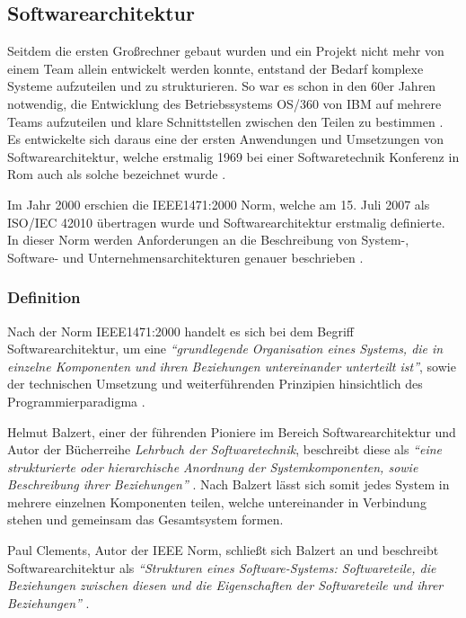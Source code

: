 \subsection{Softwarearchitektur}

Seitdem die ersten Großrechner gebaut wurden und ein Projekt nicht mehr von einem Team allein entwickelt werden konnte, entstand der Bedarf komplexe Systeme aufzuteilen und zu strukturieren. So war es schon in den 60er Jahren notwendig, die Entwicklung des Betriebssystems OS/360 von IBM auf mehrere Teams aufzuteilen und klare Schnittstellen zwischen den Teilen zu bestimmen \parencite{brooks_mythical_1995}. Es entwickelte sich daraus eine der ersten Anwendungen und Umsetzungen von Softwarearchitektur, welche erstmalig 1969 bei einer Softwaretechnik Konferenz in Rom auch als solche bezeichnet wurde \parencite[vgl.][S. 12]{buxton_software_1970}.

Im Jahr 2000 erschien die IEEE1471:2000 Norm, welche am 15. Juli 2007 als ISO/IEC 42010 übertragen wurde und Softwarearchitektur erstmalig definierte. In dieser Norm werden Anforderungen an die Beschreibung von System-, Software- und Unternehmensarchitekturen genauer beschrieben \parencite{hilliard_isoiecieee_nodate}.

\subsubsection{Definition}
\label{sec:software-architect-definition}

Nach der Norm IEEE1471:2000 handelt es sich bei dem Begriff Softwarearchitektur, um eine  \textit{\enquote{grundlegende Organisation eines Systems, die in einzelne Komponenten und ihren Beziehungen untereinander unterteilt ist}}, sowie der technischen Umsetzung und weiterführenden Prinzipien hinsichtlich des Programmierparadigma \parencite[][S. 12]{clements_comparing_2005}.

Helmut Balzert, einer der führenden Pioniere im Bereich Softwarearchitektur und Autor der Bücherreihe \textit{Lehrbuch der Softwaretechnik}, beschreibt diese als \textit{\enquote{eine strukturierte oder hierarchische Anordnung der Systemkomponenten, sowie Beschreibung ihrer Beziehungen}} \parencite[][S. 580]{balzert_lehrbuch_2011}. Nach Balzert lässt sich somit jedes System in mehrere einzelnen Komponenten teilen, welche untereinander in Verbindung stehen und gemeinsam das Gesamtsystem formen.

Paul Clements, Autor der IEEE Norm, schließt sich Balzert an und beschreibt Softwarearchitektur als \textit{\enquote{Strukturen eines Software-Systems: Softwareteile, die Beziehungen zwischen diesen und die Eigenschaften der Softwareteile und ihrer Beziehungen}} \parencite[][S. 23]{clements_documenting_2010}.

